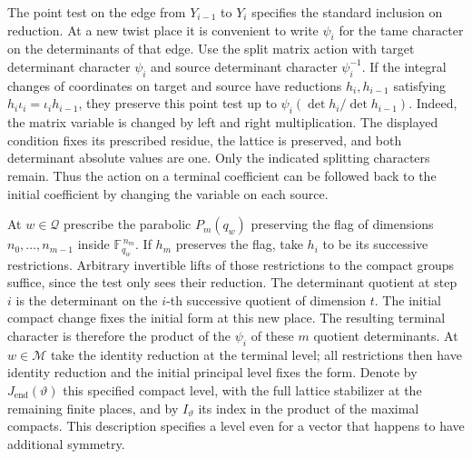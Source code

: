 \documentclass[a4paper,11pt]{article}
\theoremstyle{definition}
\theoremstyle{remark}
\numberwithin{equation}{section}
\begin{document}
The point test on the edge from \(Y_{i-1}\) to \(Y_i\) specifies
the standard inclusion on reduction. At a new twist place it
is convenient to write \(\psi_i\) for the tame character on the
determinants of that edge. Use the split matrix action with
target determinant character \(\psi_i\) and source determinant
character \(\psi_i^{-1}\). If the integral changes of coordinates
on target and source have reductions \(h_i,h_{i-1}\) satisfying
\(h_i\iota_i=\iota_i h_{i-1}\), they preserve this point test
up to \(\psi_i(\det h_i/\det h_{i-1})\). Indeed, the matrix
variable is changed by left and right multiplication. The displayed
condition fixes its prescribed residue, the lattice is preserved,
and both determinant absolute values are one. Only the indicated
splitting characters remain. Thus the action on a terminal
coefficient can be followed back to the initial coefficient by
changing the variable on each source.

At \(w\in\mathcal Q\) prescribe the parabolic \(P_m(q_w)\)
preserving the flag of dimensions \(n_0,\ldots,n_{m-1}\)
inside \(\mathbb F_{q_w}^{\,n_m}\). If \(h_m\) preserves the flag,
take \(h_i\) to be its successive restrictions. Arbitrary
invertible lifts of those restrictions to the compact groups
suffice, since the test only sees their reduction. The determinant
quotient at step \(i\) is the determinant on the \(i\)-th
successive quotient of dimension \(t\). The initial compact
change fixes the initial form at this new place. The resulting
terminal character is therefore the product of the \(\psi_i\)
of these \(m\) quotient determinants. At \(w\in\mathcal M\) take
the identity reduction at the terminal level; all restrictions
then have identity reduction and the initial principal level
fixes the form. Denote by \(J_{\mathrm{end}}(\vartheta)\) this
specified compact level, with the full lattice stabilizer at
the remaining finite places, and by \(I_\vartheta\) its index
in the product of the maximal compacts. This description
specifies a level even for a vector that happens to have
additional symmetry.
\end{document}
